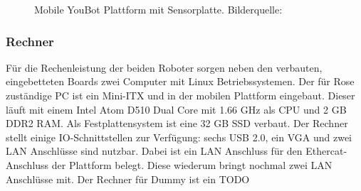  \begin{figure}[H]
 	\centering
 	\caption{Mobile YouBot Plattform mit Sensorplatte. Bilderquelle:\cite{kuka2015}}
 	\label{fig:basic-aufbau-youbot-base-full}
 \end{figure}

\subsubsection{Rechner}
Für die Rechenleistung der beiden Roboter sorgen neben den verbauten, eingebetteten Boards zwei Computer mit Linux Betriebssystemen.
Der für Rose zuständige PC ist ein Mini-ITX und in der mobilen Plattform eingebaut. Dieser läuft mit einem Intel Atom D510 Dual Core mit 1.66 GHz als CPU und 2 GB DDR2 RAM. Als Festplattensystem ist eine 32 GB SSD verbaut. Der Rechner stellt einige IO-Schnittstellen zur Verfügung: sechs USB 2.0, ein VGA und zwei LAN Anschlüsse sind nutzbar. Dabei ist ein LAN Anschluss für den Ethercat-Anschluss der Plattform belegt. Diese wiederum bringt nochmal zwei LAN Anschlüsse mit. Der Rechner für Dummy ist ein TODO %

